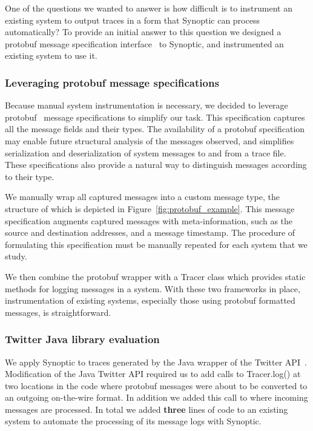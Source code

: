 One of the questions we wanted to answer is how difficult is to
instrument an existing system to output traces in a form that Synoptic
can process automatically? To provide an initial answer to this
question we designed a protobuf message specification
interface~\cite{protobuf} to Synoptic, and instrumented an existing
system to use it.

\subsubsection{Leveraging protobuf message specifications}

Because manual system instrumentation is necessary, we decided to
leverage protobuf~\cite{protobuf} message specifications to simplify
our task. This specification captures all the message fields and their
types. The availability of a protobuf specification may enable future
structural analysis of the messages observed, and simplifies
serialization and deserialization of system messages to and from a
trace file. These specifications also provide a natural way to
distinguish messages according to their type.


We manually wrap all captured messages into a custom message type, the
structure of which is depicted in
Figure~\ref{fig:protobuf_example}. This message specification augments
captured messages with meta-information, such as the source and
destination addresses, and a message timestamp. The procedure of
formulating this specification must be manually repeated for each
system that we study.

We then combine the protobuf wrapper with a Tracer class which
provides static methods for logging messages in a system.  With these
two frameworks in place, instrumentation of existing systems,
especially those using protobuf formatted messages, is
straightforward.

\subsubsection{Twitter Java library evaluation}

We apply Synoptic to traces generated by the Java wrapper of the
Twitter API~\cite{JavaTwitterAPI}. Modification of the Java Twitter
API required us to add calls to Tracer.log() at two locations in the
code where protobuf messages were about to be converted to an outgoing
on-the-wire format. In addition we added this call to where incoming
messages are processed. In total we added \textbf{three} lines of code
to an existing system to automate the processing of its message logs
with Synoptic.

